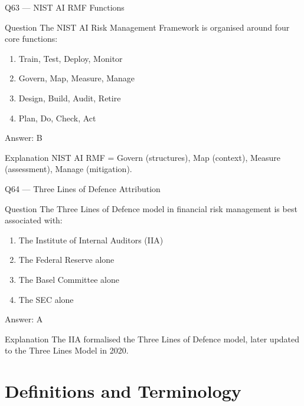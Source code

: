 \documentclass[aspectratio=169,8pt]{beamer}
\begin{document}
	\begin{frame}{Q63 --- NIST AI RMF Functions}
		\begin{block}{Question}
			The NIST AI Risk Management Framework is organised around four core functions:
			\begin{enumerate}
				\item Train, Test, Deploy, Monitor
				\item Govern, Map, Measure, Manage
				\item Design, Build, Audit, Retire
				\item Plan, Do, Check, Act
			\end{enumerate}
		\end{block}
		\begin{exampleblock}{Answer: B}\end{exampleblock}
		\begin{block}{Explanation}
			NIST AI RMF = Govern (structures), Map (context), Measure (assessment), Manage (mitigation).
		\end{block}
	\end{frame}
	
	\begin{frame}{Q64 --- Three Lines of Defence Attribution}
		\begin{block}{Question}
			The Three Lines of Defence model in financial risk management is best associated with:
			\begin{enumerate}
				\item The Institute of Internal Auditors (IIA)
				\item The Federal Reserve alone
				\item The Basel Committee alone
				\item The SEC alone
			\end{enumerate}
		\end{block}
		\begin{exampleblock}{Answer: A}\end{exampleblock}
		\begin{block}{Explanation}
			The IIA formalised the Three Lines of Defence model, later updated to the Three Lines Model in 2020.
		\end{block}
	\end{frame}
	
	\section{Definitions and Terminology}
	
\end{document}
